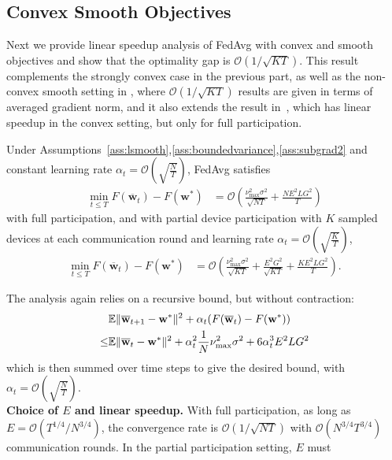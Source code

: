 \subsection{Convex Smooth Objectives}
Next we provide linear speedup analysis of FedAvg with convex and
smooth objectives and show that the optimality gap is $\mathcal{O}(1/\sqrt{KT})$. 
This result complements the strongly convex case in the previous part, as well as the non-convex
smooth setting in \cite{jiang2018linear,yu2019parallel,haddadpour2019convergence},
where $\mathcal{O}(1/\sqrt{KT})$ results are given in terms of averaged
gradient norm, and it also extends the result in~\cite{khaled2020tighter}, which has linear speedup in the convex setting, but only for full participation.
\begin{theorem}
	\label{thm:SGD_cvx}Under Assumptions~\ref{ass:lsmooth},\ref{ass:boundedvariance},\ref{ass:subgrad2} and constant learning
	rate $\alpha_{t}=\mathcal{O}(\sqrt{\frac{N}{T}})$, FedAvg satisfies
	\begin{align*}
	\min_{t\leq T}F(\overline{\mathbf{w}}_{t})-F(\mathbf{w}^{\ast}) & =\mathcal{O}\left(\frac{\nu_{\max}^{2}\sigma^{2}}{\sqrt{NT}}+\frac{NE^{2}LG^{2}}{T}\right)
	\end{align*}
	with full participation, and with partial device participation with $K$ sampled devices at
	each communication round and learning rate $\alpha_{t}=\mathcal{O}(\sqrt{\frac{K}{T}})$,
	\begin{align*}
	\min_{t\leq T}F(\overline{\mathbf{w}}_{t})-F(\mathbf{w}^{\ast}) & =\mathcal{O}\left(\frac{\nu_{\max}^{2}\sigma^{2}}{\sqrt{KT}}+\frac{E^{2}G^{2}}{\sqrt{KT}}+\frac{KE^{2}LG^{2}}{T}\right).
	\end{align*}
\end{theorem}
The analysis again relies on a recursive bound, but without contraction: 
\begin{align*}
	& \mathbb{E}\|{\overline{\mathbf{w}}}_{t+1}-{\mathbf{w}}^{\ast}\|^{2}+\alpha_{t}(F({\overline{\mathbf{w}}}_{t})-F({\mathbf{w}}^{\ast})) \\
 \leq &\mathbb{E}\|{\overline{\mathbf{w}}}_{t}-{\mathbf{w}}^{\ast}\|^{2}+\alpha_{t}^{2}\frac{1}{N}\nu_{\max}^{2}\sigma^{2}+6\alpha_{t}^{3}E^{2}LG^{2}
	\end{align*}
which is then summed over time steps to give the desired bound, with $\alpha_{t}=\mathcal{O}(\sqrt{\frac{N}{T}})$. \\
%
\textbf{Choice of $E$ and linear speedup. }With full participation,
as long as $E=\mathcal{O}(T^{1/4}/N^{3/4})$, the convergence
rate is $\mathcal{O}(1/\sqrt{NT})$ with $\mathcal{O}(N^{3/4}T^{3/4})$
communication rounds. In the partial participation setting, $E$ must

